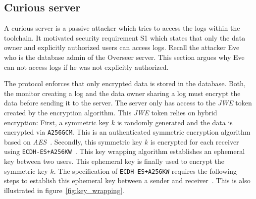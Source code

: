 \documentclass[../main.tex]{subfiles}
\begin{document}
\subsection{Curious server}
A curious server is a passive attacker which tries to access the logs within the toolchain.
It motivated security requirement S1 which states that only the data owner and explicitly authorized users can access logs.
Recall the attacker Eve who is the database admin of the Overseer server.
This section argues why Eve can not access logs if he was not explicitly authorized.

The protocol enforces that only encrypted data is stored in the database.
Both, the monitor creating a log and the data owner sharing a log must encrypt the data before sending it to the server.
The server only has access to the \emph{JWE} token created by the encryption algorithm.
This \emph{JWE} token relies on hybrid encryption:
First, a symmetric key $k$ is randomly generated and the data is encrypted via \verb|A256GCM|.
This is an authenticated symmetric encryption algorithm based on \emph{AES}~\cite{Jones2015}.
Secondly, this symmetric key $k$ is encrypted for each receiver using \verb|ECDH-ES+A256KW|~\cite{Jones2015}.
This key wrapping algorithm establishes an ephemeral key between two users.
This ephemeral key is finally used to encrypt the symmetric key $k$.
The specification of \verb|ECDH-ES+A256KW| requires the following steps to establish this ephemeral key between a sender and receiver~\cite[100]{Barker2017}.
This is also illustrated in figure~\ref{fig:key_wrapping}.
\end{document}

